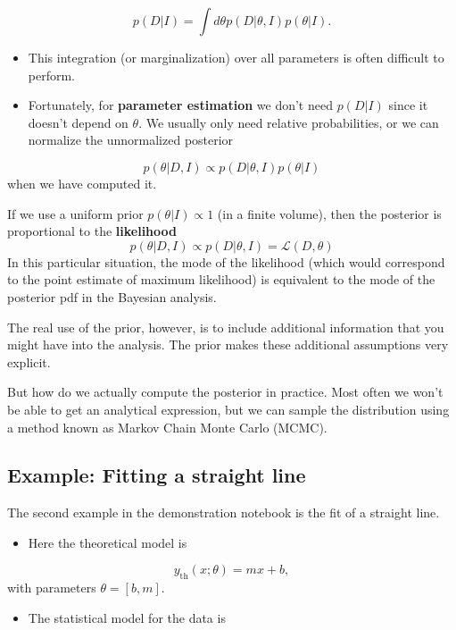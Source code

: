 \documentclass[%
oneside,                 %
final,                   %
10pt]{article}
\begin{document}
\noindent
\[
p(D|I) = \int d\theta p(D|\theta,I) p(\theta|I).
\]
\begin{itemize}
\item This integration (or marginalization) over all parameters is often difficult to perform.

\item Fortunately, for \textbf{parameter estimation} we don't need $p(D|I)$ since it doesn't depend on $\theta$. We usually only need relative probabilities, or we can normalize the unnormalized posterior 
\end{itemize}

\noindent
\[
p(\theta | D,I) \propto p(D|\theta,I) p(\theta|I)
\]
when we have computed it.

If we use a uniform prior $p(\theta | I ) \propto 1$ (in a finite volume), then the posterior is proportional to the \textbf{likelihood}
\[
p(\theta | D,I) \propto p(D|\theta,I) = \mathcal{L}(D,\theta)
\]
In this particular situation, the mode of the likelihood (which would correspond to the point estimate of maximum likelihood) is equivalent to the mode of the posterior pdf in the Bayesian analysis.

The real use of the prior, however, is to include additional information that you might have into the analysis. The prior makes these additional assumptions very explicit.

But how do we actually compute the posterior in practice. Most often we won't be able to get an analytical expression, but we can sample the distribution using a method known as Markov Chain Monte Carlo (MCMC).

\subsection{Example: Fitting a straight line}
The second example in the demonstration notebook is the fit of a straight line.

\begin{itemize}
\item Here the theoretical model is
\end{itemize}

\noindent
\[
y_\mathrm{th}(x; \theta) = m x + b,
\]
with parameters $\theta = [b,m]$.

\begin{itemize}
\item The statistical model for the data is
\end{itemize}
\end{document}
